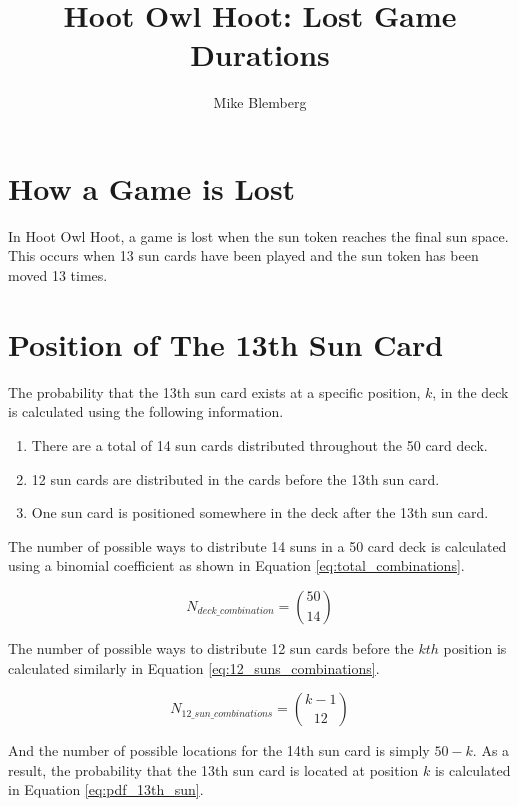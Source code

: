 \documentclass{IEEEtran}
\begin{document}
    
\title{Hoot Owl Hoot: Lost Game Durations}
\author{Mike Blemberg}
\maketitle

\section{How a Game is Lost}
In Hoot Owl Hoot, a game is lost when the sun token reaches the final sun space.  This occurs when 13 sun cards have been played and the sun token has been moved 13 times.

\section{Position of The 13th Sun Card}
The probability that the 13th sun card exists at a specific position, $k$, in the deck is calculated using the following information.

\begin{enumerate}
    \item There are a total of 14 sun cards distributed throughout the 50 card deck.
    \item 12 sun cards are distributed in the cards before the 13th sun card.
    \item One sun card is positioned somewhere in the deck after the 13th sun card.
\end{enumerate}

The number of possible ways to distribute 14 suns in a 50 card deck is calculated using a binomial coefficient as shown in Equation \ref{eq:total_combinations}.

\begin{equation} \label{eq:total_combinations}
N_{deck\_combination} = \binom{50}{14}
\end{equation}

The number of possible ways to distribute 12 sun cards before the $kth$ position is calculated similarly in Equation \ref{eq:12_suns_combinations}.

\begin{equation} \label{eq:12_suns_combinations}
N_{12\_sun\_combinations} = \binom{k-1}{12}
\end{equation}

And the number of possible locations for the 14th sun card is simply $50-k$.  As a result, the probability that the 13th sun card is located at position $k$ is calculated in Equation \ref{eq:pdf_13th_sun}.
\end{document}
